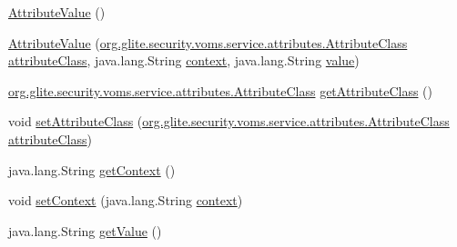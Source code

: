 \begin{DoxyCompactItemize}
\item 
\hyperlink{classorg_1_1glite_1_1security_1_1voms_1_1service_1_1attributes_1_1AttributeValue_aad8d9c5d9af13c460f5d5fce5408eed9}{AttributeValue} ()
\item 
\hyperlink{classorg_1_1glite_1_1security_1_1voms_1_1service_1_1attributes_1_1AttributeValue_a00598f8df5a5be5ec28eaeebe49da09e}{AttributeValue} (\hyperlink{classorg_1_1glite_1_1security_1_1voms_1_1service_1_1attributes_1_1AttributeClass}{org.glite.security.voms.service.attributes.AttributeClass} \hyperlink{classorg_1_1glite_1_1security_1_1voms_1_1service_1_1attributes_1_1AttributeValue_a1cbf215d1cf7105a3680f39d81a8a6c5}{attributeClass}, java.lang.String \hyperlink{classorg_1_1glite_1_1security_1_1voms_1_1service_1_1attributes_1_1AttributeValue_acfb2dbac22d0f61179a66e37178845fd}{context}, java.lang.String \hyperlink{classorg_1_1glite_1_1security_1_1voms_1_1service_1_1attributes_1_1AttributeValue_aa1f50539b35f3efd45c50ca8165f52d8}{value})
\item 
\hyperlink{classorg_1_1glite_1_1security_1_1voms_1_1service_1_1attributes_1_1AttributeClass}{org.glite.security.voms.service.attributes.AttributeClass} \hyperlink{classorg_1_1glite_1_1security_1_1voms_1_1service_1_1attributes_1_1AttributeValue_a077926e599abfddc1625730f3ef269e8}{getAttributeClass} ()
\item 
void \hyperlink{classorg_1_1glite_1_1security_1_1voms_1_1service_1_1attributes_1_1AttributeValue_ac6e8e91cb7ca69028c0de65b6ba3e684}{setAttributeClass} (\hyperlink{classorg_1_1glite_1_1security_1_1voms_1_1service_1_1attributes_1_1AttributeClass}{org.glite.security.voms.service.attributes.AttributeClass} \hyperlink{classorg_1_1glite_1_1security_1_1voms_1_1service_1_1attributes_1_1AttributeValue_a1cbf215d1cf7105a3680f39d81a8a6c5}{attributeClass})
\item 
java.lang.String \hyperlink{classorg_1_1glite_1_1security_1_1voms_1_1service_1_1attributes_1_1AttributeValue_a91e49b78a55daf65c1f1a1178f6c3b1a}{getContext} ()
\item 
void \hyperlink{classorg_1_1glite_1_1security_1_1voms_1_1service_1_1attributes_1_1AttributeValue_a831f95600ae460667f89178d75a3689d}{setContext} (java.lang.String \hyperlink{classorg_1_1glite_1_1security_1_1voms_1_1service_1_1attributes_1_1AttributeValue_acfb2dbac22d0f61179a66e37178845fd}{context})
\item 
java.lang.String \hyperlink{classorg_1_1glite_1_1security_1_1voms_1_1service_1_1attributes_1_1AttributeValue_a4d3aeb584986394b980733fcf954d2fa}{getValue} ()

\end{DoxyCompactItemize}
